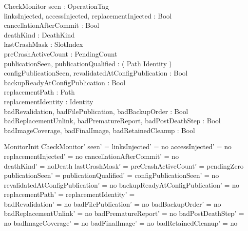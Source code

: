 \documentclass{article}
\begin{document}
\begin{schema}{CheckMonitor}
	seen : \power OperationTag \\
	linksInjected, accessInjected, replacementInjected : Bool \\
	cancellationAfterCommit : Bool \\
	deathKind : DeathKind \\
	lastCrashMask : \power SlotIndex \\
	preCrashActiveCount : PendingCount \\
	publicationSeen, publicationQualified : \power ( Path \cross Identity ) \\
	configPublicationSeen, revalidatedAtConfigPublication : Bool \\
	backupReadyAtConfigPublication : Bool \\
	replacementPath : \power Path \\
	replacementIdentity : \power Identity \\
	badRevalidation, badFilePublication, badBackupOrder : Bool \\
	badReplacementUnlink, badPrematureReport, badPostDeathStep : Bool \\
	badImageCoverage, badFinalImage, badRetainedCleanup : Bool
\end{schema}

\begin{schema}{MonitorInit}
	CheckMonitor'
	\where
	seen' = \emptyset \land linksInjected' = no \land accessInjected' = no \land
	replacementInjected' = no \land cancellationAfterCommit' = no \\
	deathKind' = noDeath \land lastCrashMask' = \emptyset \land
	preCrashActiveCount' = pendingZero \\
	publicationSeen' = \emptyset \land publicationQualified' = \emptyset \land
	configPublicationSeen' = no \land revalidatedAtConfigPublication' = no \land
	backupReadyAtConfigPublication' = no \\
	replacementPath' = \emptyset \land replacementIdentity' = \emptyset \\
	badRevalidation' = no \land badFilePublication' = no \land
	badBackupOrder' = no \land badReplacementUnlink' = no \land
	badPrematureReport' = no \land badPostDeathStep' = no \land
	badImageCoverage' = no \land badFinalImage' = no \land
	badRetainedCleanup' = no
\end{schema}
\end{document}
